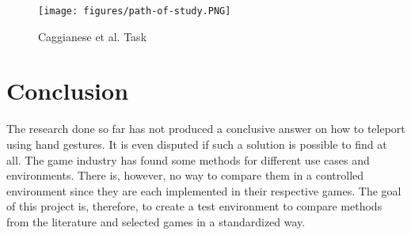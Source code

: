 \begin{figure}[hbt!]
  \centering
  \texttt{[image: figures/path-of-study.PNG]}
  \caption{Caggianese et al. \cite{Caggianese} Task}
  \label{fig:path}
\end{figure}


\section{Conclusion}
The research done so far has not produced a conclusive answer on how to teleport using hand gestures. It is even disputed if such a solution is possible to find at all. The game industry has found some methods for different use cases and environments. There is, however, no way to compare them in a controlled environment since they are each implemented in their respective games. The goal of this project is, therefore, to create a test environment to compare methods from the literature and selected games in a standardized way. 
